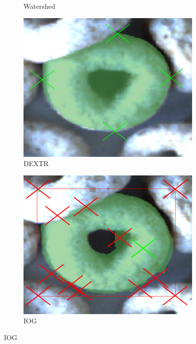 \begin{figure}
\begin{subfigure}[t]{0.3\textwidth}
		\caption{Watershed}
	\end{subfigure}
	\hfill
	\begin{subfigure}[t]{0.3\textwidth}
		\centering
		\includegraphics[width=\textwidth]{figures/appendix/method_predictions/cereal67_dextr.png}
		\caption{DEXTR}
	\end{subfigure}
	\hfill
	\begin{subfigure}[t]{0.3\textwidth}
		\centering
		\includegraphics[width=\textwidth]{figures/appendix/method_predictions/cereal67_iog.png}
		\caption{
			IOG
		}
	\end{subfigure}

\end{figure}
